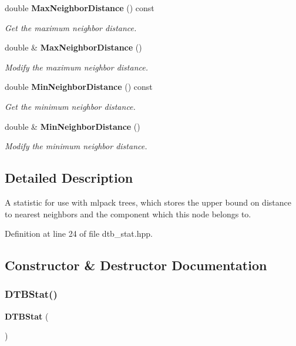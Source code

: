 \begin{DoxyCompactItemize}
double \textbf{ Max\+Neighbor\+Distance} () const
\begin{DoxyCompactList}\small\item\em Get the maximum neighbor distance. \end{DoxyCompactList}\item 
double \& \textbf{ Max\+Neighbor\+Distance} ()
\begin{DoxyCompactList}\small\item\em Modify the maximum neighbor distance. \end{DoxyCompactList}\item 
double \textbf{ Min\+Neighbor\+Distance} () const
\begin{DoxyCompactList}\small\item\em Get the minimum neighbor distance. \end{DoxyCompactList}\item 
double \& \textbf{ Min\+Neighbor\+Distance} ()
\begin{DoxyCompactList}\small\item\em Modify the minimum neighbor distance. \end{DoxyCompactList}\end{DoxyCompactItemize}


\subsection{Detailed Description}
A statistic for use with mlpack trees, which stores the upper bound on distance to nearest neighbors and the component which this node belongs to. 

Definition at line 24 of file dtb\+\_\+stat.\+hpp.



\subsection{Constructor \& Destructor Documentation}
\mbox{\label{classmlpack_1_1emst_1_1DTBStat_abf24d1728c9b1953062c6a2486aa2efa}} 
\subsubsection{D\+T\+B\+Stat()\hspace{0.1cm}{\footnotesize\ttfamily [1/2]}}
{\footnotesize\ttfamily \textbf{ D\+T\+B\+Stat} (\begin{DoxyParamCaption}{ }\end{DoxyParamCaption})\hspace{0.3cm}{\ttfamily [inline]}}




